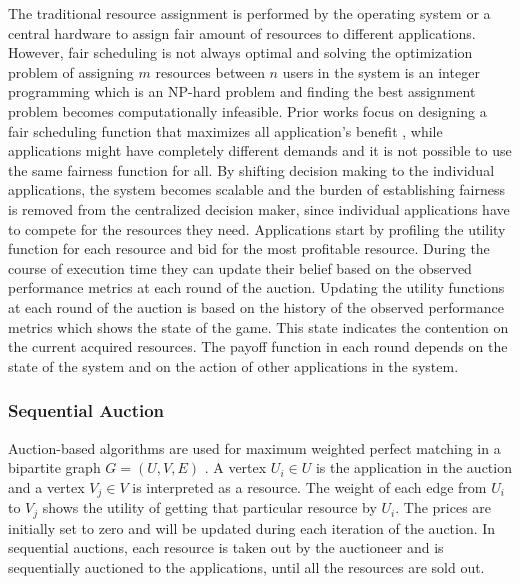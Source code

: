 \indent The traditional resource assignment is performed by the operating system or a central hardware to assign fair amount of resources to different applications. However, fair scheduling is not always optimal and solving the optimization problem of assigning $m$ resources between $n$ users in the system is an integer programming which is an NP-hard problem and finding the best assignment problem becomes computationally infeasible. Prior works focus on designing a fair scheduling function that maximizes all application's benefit \cite{zahedi2014ref, llull2017cooper, ghodsi2011dominant, zahedi2015sharing, fan2016computational}, while applications might have completely different demands and it is not possible to use the same fairness function for all. By shifting decision making to the individual applications, the system becomes scalable and the burden of establishing fairness is removed from the centralized decision maker, since individual applications have to compete for the resources they need. Applications start by profiling the utility function for each resource and bid for the most profitable resource. During the course of execution time they can update their belief based on the observed performance metrics at each round of the auction. Updating the utility functions at each round of the auction is based on the history of the observed performance metrics which shows the state of the game. 
This state indicates the contention on the current acquired resources. The payoff function in each round depends on the state of the system and on the action of other applications in the system. 
\subsubsection{Sequential Auction}
Auction-based algorithms are used for maximum weighted perfect matching in a bipartite graph $G=(U,V, E)$ \cite{bertsekas1998network, kyle1985continuous, vasconcelos2009bipartite}. A vertex  $U_i \in U$ is the application in the auction and a vertex $V_j \in V$ is interpreted as a resource. The weight of each edge from $U_i$ to $V_j$ shows the utility of getting that particular resource by $U_i$. The prices are initially set to zero and will be updated during each iteration of the auction. In sequential auctions, each resource is taken out by the auctioneer and is sequentially auctioned to the applications, until all the resources are sold out.
